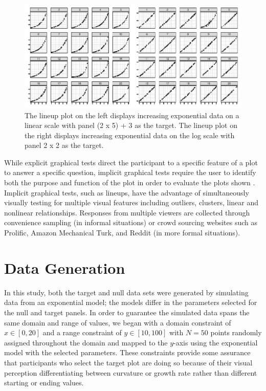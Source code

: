 \documentclass[12pt]{article}
\begin{document}
\begin{figure}[tbp]

{\centering \includegraphics[width=\linewidth,]{logarithmic-lineups_files/figure-latex/lineup-example-1} 

}

\caption[Lineup examples]{The lineup plot on the left displays increasing exponential data on a linear scale with panel (2 x 5) + 3 as the target. The lineup plot on the right displays increasing exponential data on the log scale with panel 2 x 2 as the target.}\label{fig:lineup-example}
\end{figure}

While explicit graphical tests direct the participant to a specific
feature of a plot to answer a specific question, implicit graphical
tests require the user to identify both the purpose and function of the
plot in order to evaluate the plots shown
\citep{vanderplas_testing_2020}. Implicit graphical tests, such as
lineups, have the advantage of simultaneously visually testing for
multiple visual features including outliers, clusters, linear and
nonlinear relationships. Responses from multiple viewers are collected
through convenience sampling (in informal situations) or crowd sourcing
websites such as Prolific, Amazon Mechanical Turk, and Reddit (in more
formal situations).

\hypertarget{data-generation}{%
\section{Data Generation}\label{data-generation}}

In this study, both the target and null data sets were generated by
simulating data from an exponential model; the models differ in the
parameters selected for the null and target panels. In order to
guarantee the simulated data spans the same domain and range of values,
we began with a domain constraint of \(x\in [0,20]\) and a range
constraint of \(y\in [10,100]\) with \(N = 50\) points randomly assigned
throughout the domain and mapped to the \(y\)-axis using the exponential
model with the selected parameters. These constraints provide some
assurance that participants who select the target plot are doing so
because of their visual perception differentiating between curvature or
growth rate rather than different starting or ending values.
\end{document}
